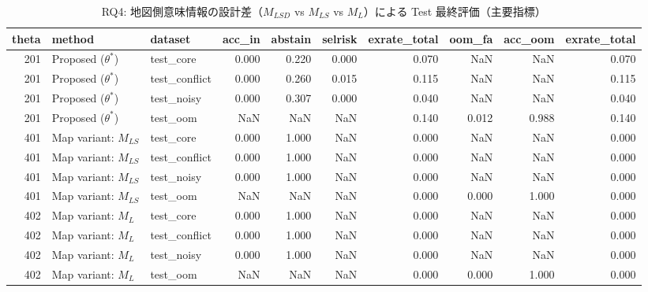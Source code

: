 \begin{table}[t]
\centering
\begin{tabular}{rllrrrrrrr}
\toprule
theta & method & dataset & acc_in & abstain & selrisk & exrate_total & oom_fa & acc_oom & exrate_total \\
\midrule
201 & Proposed ($\theta^\ast$) & test_core & 0.000 & 0.220 & 0.000 & 0.070 & NaN & NaN & 0.070 \\
201 & Proposed ($\theta^\ast$) & test_conflict & 0.000 & 0.260 & 0.015 & 0.115 & NaN & NaN & 0.115 \\
201 & Proposed ($\theta^\ast$) & test_noisy & 0.000 & 0.307 & 0.000 & 0.040 & NaN & NaN & 0.040 \\
201 & Proposed ($\theta^\ast$) & test_oom & NaN & NaN & NaN & 0.140 & 0.012 & 0.988 & 0.140 \\
401 & Map variant: $M_{LS}$ & test_core & 0.000 & 1.000 & NaN & 0.000 & NaN & NaN & 0.000 \\
401 & Map variant: $M_{LS}$ & test_conflict & 0.000 & 1.000 & NaN & 0.000 & NaN & NaN & 0.000 \\
401 & Map variant: $M_{LS}$ & test_noisy & 0.000 & 1.000 & NaN & 0.000 & NaN & NaN & 0.000 \\
401 & Map variant: $M_{LS}$ & test_oom & NaN & NaN & NaN & 0.000 & 0.000 & 1.000 & 0.000 \\
402 & Map variant: $M_{L}$ & test_core & 0.000 & 1.000 & NaN & 0.000 & NaN & NaN & 0.000 \\
402 & Map variant: $M_{L}$ & test_conflict & 0.000 & 1.000 & NaN & 0.000 & NaN & NaN & 0.000 \\
402 & Map variant: $M_{L}$ & test_noisy & 0.000 & 1.000 & NaN & 0.000 & NaN & NaN & 0.000 \\
402 & Map variant: $M_{L}$ & test_oom & NaN & NaN & NaN & 0.000 & 0.000 & 1.000 & 0.000 \\
\bottomrule
\end{tabular}

\caption{RQ4: 地図側意味情報の設計差（$M_{LSD}$ vs $M_{LS}$ vs $M_L$）による Test 最終評価（主要指標）}
\label{tab:rq4_map_variants}
\end{table}
